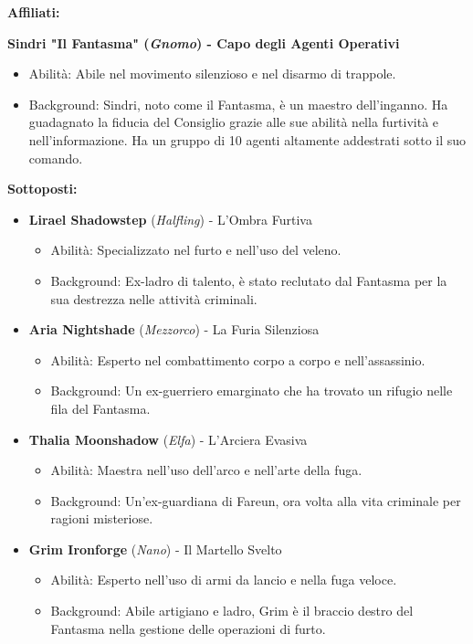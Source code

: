 \documentclass{article}
\begin{document}
\textbf{Affiliati:}

\textbf{Sindri "Il Fantasma" (\textit{Gnomo}) - Capo degli Agenti Operativi}
\begin{itemize}
  \item Abilità: Abile nel movimento silenzioso e nel disarmo di trappole.
  \item Background: Sindri, noto come il Fantasma, è un maestro dell'inganno. Ha guadagnato la fiducia del Consiglio grazie alle sue abilità nella furtività e nell'informazione. Ha un gruppo di 10 agenti altamente addestrati sotto il suo comando.
\end{itemize}

\textbf{Sottoposti:}
\begin{itemize}
  \item \textbf{Lirael Shadowstep} (\textit{Halfling}) - L'Ombra Furtiva
    \begin{itemize}
      \item Abilità: Specializzato nel furto e nell'uso del veleno.
      \item Background: Ex-ladro di talento, è stato reclutato dal Fantasma per la sua destrezza nelle attività criminali.
    \end{itemize}

  \item \textbf{Aria Nightshade} (\textit{Mezzorco}) - La Furia Silenziosa
    \begin{itemize}
      \item Abilità: Esperto nel combattimento corpo a corpo e nell'assassinio.
      \item Background: Un ex-guerriero emarginato che ha trovato un rifugio nelle fila del Fantasma.
    \end{itemize}

  \item \textbf{Thalia Moonshadow} (\textit{Elfa}) - L'Arciera Evasiva
    \begin{itemize}
      \item Abilità: Maestra nell'uso dell'arco e nell'arte della fuga.
      \item Background: Un'ex-guardiana di Fareun, ora volta alla vita criminale per ragioni misteriose.
    \end{itemize}

  \item \textbf{Grim Ironforge} (\textit{Nano}) - Il Martello Svelto
    \begin{itemize}
      \item Abilità: Esperto nell'uso di armi da lancio e nella fuga veloce.
      \item Background: Abile artigiano e ladro, Grim è il braccio destro del Fantasma nella gestione delle operazioni di furto.
    \end{itemize}


\end{itemize}
\end{document}
